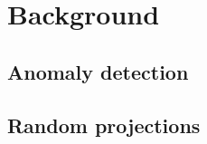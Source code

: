 \chapter{Background}
\label{ch:background}

\section{Anomaly detection}

\section{Random projections}
